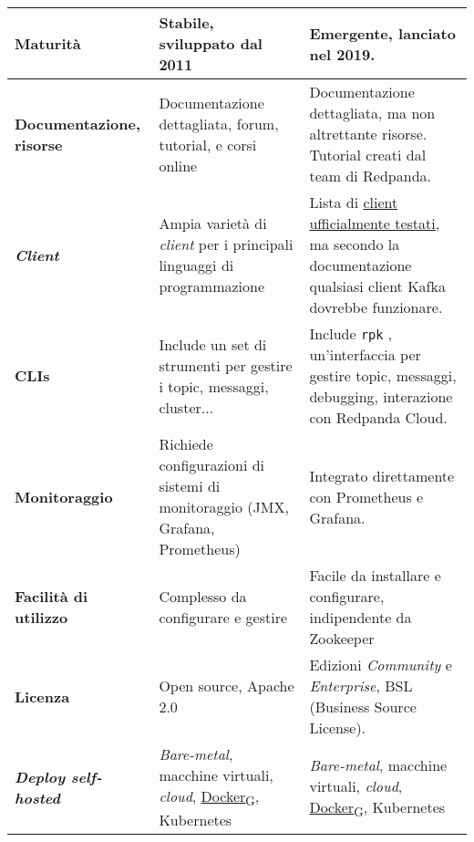 \begin{longtable}{|p{4cm}||p{5.5cm}|p{5.5cm}|}
	\textbf{Maturità}                    & Stabile, sviluppato dal 2011                                                  & Emergente, lanciato nel 2019.                                                                                                                                                    \\
	\hline
	\textbf{Documentazione, risorse}     & Documentazione dettagliata, forum, tutorial, e corsi online                   & Documentazione dettagliata, ma non altrettante risorse. Tutorial creati dal team di Redpanda.                                                                                    \\
	\hline
	\textbf{\textit{Client}}             & Ampia varietà di \textit{client} per i principali linguaggi di programmazione & Lista di \href{https://docs.redpanda.com/current/develop/kafka-clients/}{client ufficialmente testati}, ma secondo la documentazione qualsiasi client Kafka dovrebbe funzionare. \\
	\hline
	\textbf{CLIs}                        & Include un set di strumenti per gestire i topic, messaggi, cluster...         & Include \texttt{rpk} , un'interfaccia per gestire topic, messaggi, debugging, interazione con Redpanda Cloud.                                                                    \\
	\hline
	\textbf{Monitoraggio}                & Richiede configurazioni di sistemi di monitoraggio (JMX, Grafana, Prometheus) & Integrato direttamente con Prometheus e Grafana.                                                                                                                                 \\
	\hline
	\textbf{Facilità di utilizzo}        & Complesso da configurare e gestire                                            & Facile da installare e configurare, indipendente da Zookeeper                                                                                                                    \\
	\hline
	\textbf{Licenza}                     & Open source, Apache 2.0                                                       & Edizioni \textit{Community} e \textit{Enterprise}, BSL (Business Source License).                                                                                                \\
	\hline
	\textbf{\textit{Deploy self-hosted}} & \textit{Bare-metal}, macchine virtuali, \textit{cloud}, \href{https://7last.github.io/docs/rtb/documentazione-interna/glossario#docker}{Docker\textsubscript{G}}, Kubernetes    & \textit{Bare-metal}, macchine virtuali, \textit{cloud}, \href{https://7last.github.io/docs/rtb/documentazione-interna/glossario#docker}{Docker\textsubscript{G}}, Kubernetes                                                                                                       \\

\end{longtable}
